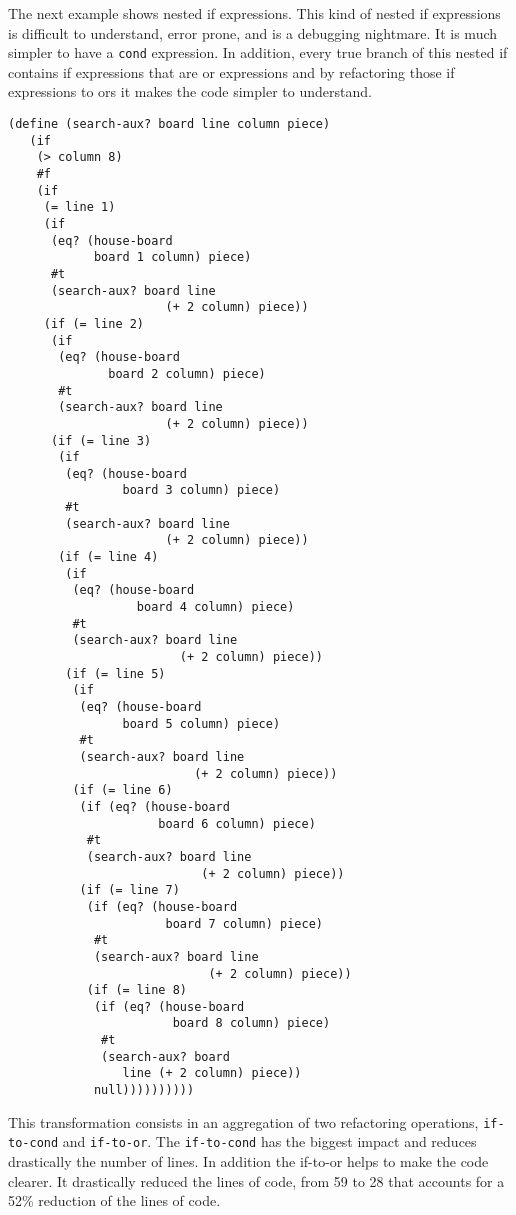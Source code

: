 The next example shows nested if expressions. This kind of nested if expressions
is difficult to understand, error prone, and is a debugging nightmare.
It is much simpler to have a {\tt cond} expression.
In addition, every true branch of this nested if contains if expressions that are
or expressions and by refactoring those if expressions to ors it makes the code
simpler to understand.
\begin{lstlisting}[basicstyle=\ttfamily]
  (define (search-aux? board line column piece)
   (if
    (> column 8)
    #f
    (if
     (= line 1)
     (if
      (eq? (house-board
            board 1 column) piece)
      #t
      (search-aux? board line
                      (+ 2 column) piece))
     (if (= line 2)
      (if
       (eq? (house-board
              board 2 column) piece)
       #t
       (search-aux? board line
                      (+ 2 column) piece))
      (if (= line 3)
       (if
        (eq? (house-board
                board 3 column) piece)
        #t
        (search-aux? board line
                      (+ 2 column) piece))
       (if (= line 4)
        (if
         (eq? (house-board
                  board 4 column) piece)
         #t
         (search-aux? board line
                        (+ 2 column) piece))
        (if (= line 5)
         (if
          (eq? (house-board
                board 5 column) piece)
          #t
          (search-aux? board line
                          (+ 2 column) piece))
         (if (= line 6)
          (if (eq? (house-board
                     board 6 column) piece)
           #t
           (search-aux? board line
                           (+ 2 column) piece))
          (if (= line 7)
           (if (eq? (house-board
                      board 7 column) piece)
            #t
            (search-aux? board line
                            (+ 2 column) piece))
           (if (= line 8)
            (if (eq? (house-board
                       board 8 column) piece)
             #t
             (search-aux? board
                line (+ 2 column) piece))
            null))))))))))
\end{lstlisting}

This transformation consists in an aggregation of two refactoring operations, {\tt if-to-cond} and {\tt if-to-or}.
The {\tt if-to-cond} has the biggest impact and reduces drastically the number of lines.
In addition the if-to-or helps to make the code clearer.
It drastically reduced the lines of code, from 59 to 28 that accounts
for a 52\% reduction of the lines of code.

